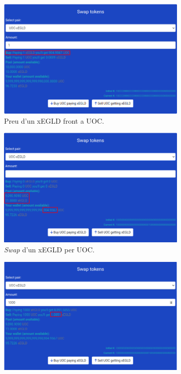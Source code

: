 \documentclass[11pt,a4paper]{article}
\begin{document}
\begin{figure}[!htb]
	\begin{subfigure}[b]{0.42\textwidth}
	  \includegraphics[width=\linewidth]{imp-price1.png}
	  \caption{Preu d'un xEGLD front a UOC.}\label{fig:imp-price1}
	\end{subfigure}\hfill
	\begin{subfigure}[b]{0.42\textwidth}
	  \includegraphics[width=\linewidth]{imp-price2.png}
	  \caption{\textit{Swap} d'un xEGLD per UOC.}\label{fig:imp-price2}
	\end{subfigure}\hfill
	\begin{subfigure}[b]{0.42\textwidth}
	  \includegraphics[width=\linewidth]{imp-price3.png}

\end{subfigure}
\end{figure}
\end{document}
